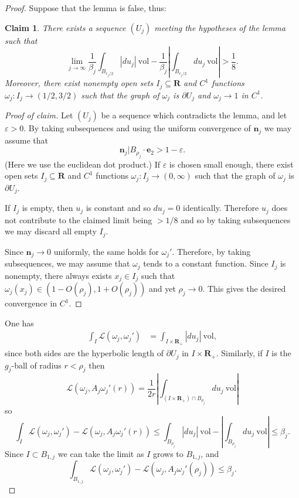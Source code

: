 \documentclass[reqno,12pt,letterpaper]{amsart}
\newcommand{\RR}{\mathbf{R}}
\newcommand{\evect}{\mathbf e}
\newcommand{\normal}{\mathbf n}
\newcommand{\vol}{\mathrm{vol}}
\newtheorem{claim}[theorem]{Claim}
\theoremstyle{definition}
\numberwithin{equation}{section}
\begin{document}
\begin{proof}
Suppose that the lemma is false, thus:

\begin{claim}
There exists a sequence $(U_j)$ meeting the hypotheses of the lemma such that
$$\lim_{j \to \infty} \frac{1}{\beta_j} \int_{B_{r_j/2}} |du_j| ~\vol - \frac{1}{\beta_j}\left|\int_{B_{r_j/2}} du_j ~\vol\right| > \frac{1}{8}.$$
Moreover, there exist nonempty open sets $I_j \subseteq \RR$ and $C^1$ functions $\omega_j: I_j \to (1/2, 3/2)$ such that the graph of $\omega_j$ is $\partial U_j$ and $\omega_j \to 1$ in $C^1$.
\end{claim}
\begin{proof}[Proof of claim]
Let $(U_j)$ be a sequence which contradicts the lemma, and let $\varepsilon > 0$.
By taking subsequences and using the uniform convergence of $\normal_j$ we may assume that
$$\normal_j|B_{\rho_j} \cdot \evect_2 > 1 - \varepsilon.$$
(Here we use the euclidean dot product.)
If $\varepsilon$ is chosen small enough, there exist open sets $I_j \subseteq \RR$ and $C^1$ functions $\omega_j: I_j \to (0, \infty)$ such that the graph of $\omega_j$ is $\partial U_j$.

If $I_j$ is empty, then $u_j$ is constant and so $du_j = 0$ identically.
Therefore $u_j$ does not contribute to the claimed limit being $> 1/8$ and so by taking subsequences we may discard all empty $I_j$.

Since $\normal_j \to 0$ uniformly, the same holds for $\omega_j'$.
Therefore, by taking subsequences, we may assume that $\omega_j$ tends to a constant function.
Since $I_j$ is nonempty, there always exists $x_j \in I_j$ such that $\omega_j(x_j) \in (1 - O(\rho_j), 1 + O(\rho_j))$ and yet $\rho_j \to 0$.
This gives the desired convergence in $C^1$.
\end{proof}

One has
\begin{align*}
\int_I \mathscr L(\omega_j, \omega_j') &= \int_{I \times \RR_+} |du_j| ~\vol,
\end{align*}
since both sides are the hyperbolic length of $\partial U_j$ in $I \times \RR_+$.
Similarly, if $I$ is the $g_j$-ball of radius $r < \rho_j$ then
$$\mathscr L(\omega_j, A_j \omega_j'(r)) = \frac{1}{2r} \left|\int_{(I \times \RR_+) \cap B_{\rho_j}} du_j ~\vol\right|$$
so
$$\int_I \mathscr L(\omega_j, \omega_j') - \mathscr L(\omega_j, A_j \omega_j'(r)) \leq \int_{B_{\rho_j}} |du_j| ~\vol - \left|\int_{B_{\rho_j}} du_j ~\vol\right| \leq \beta_j.$$
Since $I \subset B_{1, j}$ we can take the limit as $I$ grows to $B_{1, j}$, and
$$\int_{B_{1, j}} \mathscr L(\omega_j, \omega_j') - \mathscr L(\omega_j, A_j \omega_j'(\rho_j)) \leq \beta_j.$$


\end{proof}
\end{document}
